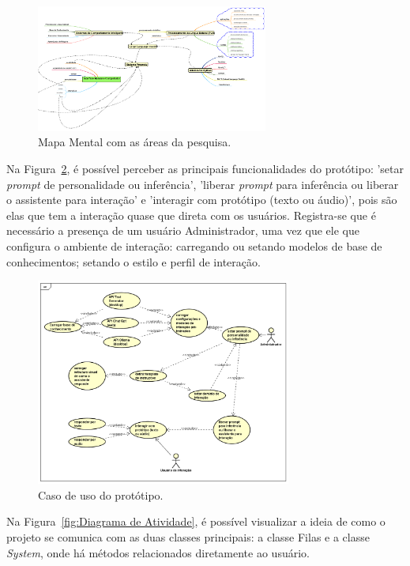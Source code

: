 \documentclass[10pt, conference, compsocconf]{IEEEtran}
\begin{document}
\FloatBarrier

\begin{figure}[!h]
\centering
\includegraphics[width=3.0in]{images/Mapa mental.png}
\caption{Mapa Mental com as áreas da pesquisa.} 
\label{fig:Mapamental}
\end{figure}

\FloatBarrier

Na Figura~\ref{fig:Casodeuso}, é possível perceber as principais funcionalidades do protótipo: 'setar \textit{prompt} de personalidade ou inferência', 'liberar \textit{prompt} para inferência ou liberar o assistente para interação' e 'interagir com protótipo (texto ou áudio)', pois são elas que tem a interação quase que direta com os usuários. Registra-se que é necessário a presença de um usuário Administrador, uma vez que ele que configura o ambiente de interação: carregando ou setando modelos de base de conhecimentos; setando o estilo e perfil de interação.

\FloatBarrier

\begin{figure}[!h]
\centering
\includegraphics[width=3.3in]{images/UseCase.png}
\caption{Caso de uso do protótipo.} 
\label{fig:Casodeuso}
\end{figure}

\FloatBarrier

Na Figura~\ref{fig:Diagrama de Atividade}, é possível visualizar a ideia de como o projeto se comunica com as duas classes principais: a classe  Filas e a classe \textit{System}, onde há  métodos relacionados diretamente  ao usuário.
\end{document}
